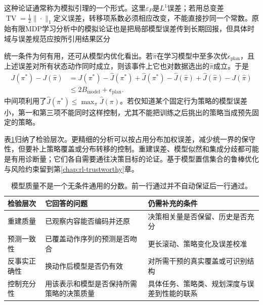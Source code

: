 这种论证通常称为模拟引理的一个形式。这里$\varepsilon_P$是$L^1$误差；若用总变差$\operatorname{TV}=\tfrac12\|\cdot\|_1$定义误差，转移项系数必须相应改变，不能直接抄同一个常数。原始有限MDP学习分析中的模拟论证也是把局部模型误差传到长期回报，但具体时域与误差规范应按所引用结果区分

统一条件为何有用，还可从模型内优化看出。若$\widehat\pi$在学习模型中至多次优$\epsilon_{\mathrm{plan}}$，且上述误差对所有状态动作同时成立，则该事件上它也对数据选出的$\widehat\pi$成立。于是
\begin{align*}
  J(\pi^*)-J(\widehat\pi)
   &=J(\pi^*)-\widehat J(\pi^*)
     +\widehat J(\pi^*)-\widehat J(\widehat\pi)
     +\widehat J(\widehat\pi)-J(\widehat\pi)\\
   &\leq 2B_{\mathrm{model}}+\epsilon_{\mathrm{plan}}.
\end{align*}
中间项利用了$\widehat J(\pi^*)\leq\max_\pi\widehat J(\pi)$。若仅知道某个固定行为策略的模型误差小，第一和第三项不能同时这样控制，尤其不能把训练之后挑出的策略当成预先固定的策略。

表\ref{tab:rl-learning-model-validity}归纳了检验层次。更精细的分析可以按占用分布加权误差，减少统一界的保守性，但要补上策略覆盖或分布转移的控制。重建误差、模型似然和集成分歧都可能是有用诊断量；它们各自需要通往决策目标的论证。基于模型置信集合的鲁棒优化与风险约束留到第\ref{chap:rl-trustworthy}章。

\begin{table}[t]
  \centering
  \small
  \begin{tabularx}{\linewidth}{>{\raggedright\arraybackslash}p{24mm} >{\raggedright\arraybackslash}X >{\raggedright\arraybackslash}X}
    \toprule
    检验层次 & 它回答的问题 & 仍需补充的条件 \\
    \midrule
    重建质量 & 已观察内容能否编码并还原 & 决策相关量是否保留、历史是否充分 \\
    预测一致性 & 已覆盖动作序列的预测是否吻合 & 更长滚动、策略变化及误差校准 \\
    反事实正确性 & 换动作后模型是否仍有效 & 对所需干预的真实覆盖或可识别结构 \\
    控制充分性 & 用该表示和模型是否保持所需策略的决策质量 & 具体任务、策略类、规划深度与误差到性能的联系 \\
    \bottomrule
  \end{tabularx}
  \caption{模型质量不是一个无条件通用的分数。前一行通过并不自动保证后一行通过。}
  \label{tab:rl-learning-model-validity}
\end{table}


